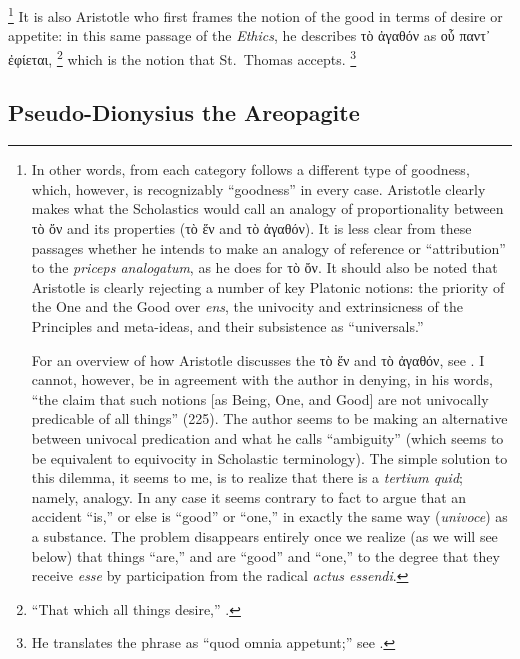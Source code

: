 \footnote{In other words, from each category follows a different type of goodness, which, however, is recognizably \enquote{goodness} in every case. Aristotle clearly makes what the Scholastics would call an analogy of proportionality between τὸ ὄν and its properties (τὸ ἕν and τὸ ἀγαθόν). It is less clear from these passages whether he intends to make an analogy of reference or \enquote{attribution} to the \emph{priceps analogatum}, as he does for τὸ ὄν. It should also be noted that Aristotle is clearly rejecting a number of key Platonic notions: the priority of the One and the Good over \emph{ens}, the univocity and extrinsicness of the Principles and meta-ideas, and their  subsistence as \enquote{universals.}

For an overview of how Aristotle discusses the τὸ ἕν and τὸ ἀγαθόν, see \cite{loux:aristotle}. I cannot, however, be in agreement with the author in denying, in his words, “the claim that such notions [as Being, One, and Good] are not univocally predicable of all things” (225). The author seems to be making an alternative between univocal predication and what he calls “ambiguity” (which seems to be equivalent to equivocity in Scholastic terminology). The simple solution to this dilemma, it seems to me, is to realize that there is a \emph{tertium quid}; namely, analogy. In any case it seems contrary to fact to argue that an accident “is,” or else is “good” or “one,” in exactly the same way (\emph{univoce}) as a substance. The problem disappears entirely once we realize (as we will see below) that things “are,” and are “good” and “one,” to the degree that they receive \emph{esse} by participation from the radical \emph{actus essendi}.}
%
It is also Aristotle who first frames the notion of the good in terms of desire or appetite: in this same passage of the \emph{Ethics}, he describes τὸ ἀγαθόν as οὗ παντ᾿ ἐφίεται,%
%
\footnote{\enquote{That which all things desire,} \cite[I, 1, 1094a3]{aristotle:ethics}.}
%
which is the notion that St.~Thomas accepts.%
%
\footnote{He translates the phrase as \enquote{quod omnia appetunt;} see \cite[I, q.~5, a.~1, co.]{st:summa}.}
%

\subsection{Pseudo-Dionysius the Areopagite}

